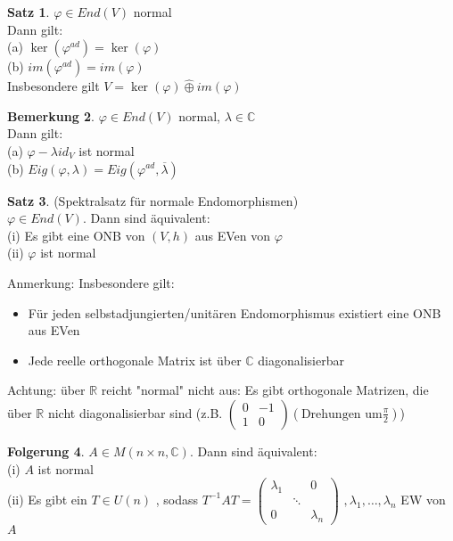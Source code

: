 \documentclass[10pt,a4paper,numbers=endperiod]{scrartcl}
\theoremstyle{definition}
\newtheorem{satz}{Satz}[section]
\newtheorem{bem}[satz]{Bemerkung}
\newtheorem{folg}[satz]{Folgerung}
\def\CC{{\mathbb C}}
\def\RR{{\mathbb R}}
\begin{document}
\begin{satz}
	$\varphi \in End(V)$ normal\\
	Dann gilt:\\
	(a) $\ker(\varphi^{ad}) = \ker(\varphi)$\\
	(b) $im(\varphi^{ad}) = im(\varphi)$\\
	Insbesondere gilt $V = \ker(\varphi) \hat{\oplus} im(\varphi)$
\end{satz}

\begin{bem}
	$\varphi \in End(V)$ normal, $\lambda \in \CC$\\
	Dann gilt:\\
	(a) $\varphi - \lambda id_V$ ist normal\\
	(b) $Eig(\varphi, \lambda) = Eig(\varphi^{ad}, \overline{\lambda})$
\end{bem}

\begin{satz}
	(Spektralsatz für normale Endomorphismen)\\
	$\varphi \in End(V)$. Dann sind äquivalent:\\
	(i) Es gibt eine ONB von $(V, h)$ aus EVen von $\varphi$\\
	(ii) $\varphi$ ist normal
\end{satz}
\newpage
Anmerkung: Insbesondere gilt:
\begin{itemize}
	\item Für jeden selbstadjungierten/unitären Endomorphismus existiert eine ONB aus EVen
	\item Jede reelle orthogonale Matrix ist über $\CC$ diagonalisierbar
\end{itemize}

Achtung: über $\RR$ reicht "normal" nicht aus: Es gibt orthogonale Matrizen, die über $\RR$ nicht diagonalisierbar sind (z.B. $\begin{pmatrix}
0 & -1\\
1 & 0 
\end{pmatrix} (\text{Drehungen um} \frac{\pi}{2})$)

\begin{folg}
	$A \in M(n \times n, \CC)$. Dann sind äquivalent:\\
	(i) $A$ ist normal\\
	(ii) Es gibt ein $T \in U(n)$ , sodass $T^{-1} A T = \begin{pmatrix}
	\lambda_1 & & 0\\
	& \ddots &\\
	0 & & \lambda_n
	\end{pmatrix}$ $, \lambda_1, \ldots, \lambda_n$ EW von $A$
\end{folg}
\end{document}
